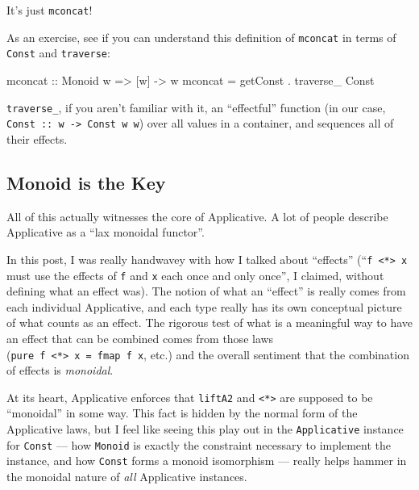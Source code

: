 \documentclass[]{article}
\newenvironment{Shaded}{}{}
\newcommand{\DataTypeTok}[1]{\textcolor[rgb]{0.56,0.13,0.00}{#1}}
\newcommand{\FunctionTok}[1]{\textcolor[rgb]{0.02,0.16,0.49}{#1}}
\newcommand{\NormalTok}[1]{#1}
\newcommand{\OperatorTok}[1]{\textcolor[rgb]{0.40,0.40,0.40}{#1}}
\newcommand{\OtherTok}[1]{\textcolor[rgb]{0.00,0.44,0.13}{#1}}
\begin{document}
It's just \texttt{mconcat}!

As an exercise, see if you can understand this definition of \texttt{mconcat} in
terms of \texttt{Const} and \texttt{traverse}:

\begin{Shaded}
\begin{Highlighting}[]
\FunctionTok{mconcat}\OtherTok{ ::} \DataTypeTok{Monoid}\NormalTok{ w }\OtherTok{=\textgreater{}}\NormalTok{ [w] }\OtherTok{{-}\textgreater{}}\NormalTok{ w}
\FunctionTok{mconcat} \OtherTok{=}\NormalTok{ getConst }\OperatorTok{.}\NormalTok{ traverse\_ }\DataTypeTok{Const}
\end{Highlighting}
\end{Shaded}

\texttt{traverse\_}, if you aren't familiar with it, an ``effectful'' function
(in our case, \texttt{Const\ ::\ w\ -\textgreater{}\ Const\ w\ w}) over all
values in a container, and sequences all of their effects.

\subsection{Monoid is the Key}\label{monoid-is-the-key}

All of this actually witnesses the core of Applicative. A lot of people describe
Applicative as a ``lax monoidal functor''.

In this post, I was really handwavey with how I talked about ``effects''
(``\texttt{f\ \textless{}*\textgreater{}\ x} must use the effects of \texttt{f}
and \texttt{x} each once and only once'', I claimed, without defining what an
effect was). The notion of what an ``effect'' is really comes from each
individual Applicative, and each type really has its own conceptual picture of
what counts as an effect. The rigorous test of what is a meaningful way to have
an effect that can be combined comes from those laws
(\texttt{pure\ f\ \textless{}*\textgreater{}\ x\ =\ fmap\ f\ x}, etc.) and the
overall sentiment that the combination of effects is \emph{monoidal}.

At its heart, Applicative enforces that \texttt{liftA2} and
\texttt{\textless{}*\textgreater{}} are supposed to be ``monoidal'' in some way.
This fact is hidden by the normal form of the Applicative laws, but I feel like
seeing this play out in the \texttt{Applicative} instance for \texttt{Const} ---
how \texttt{Monoid} is exactly the constraint necessary to implement the
instance, and how \texttt{Const} forms a monoid isomorphism --- really helps
hammer in the monoidal nature of \emph{all} Applicative instances.
\end{document}
